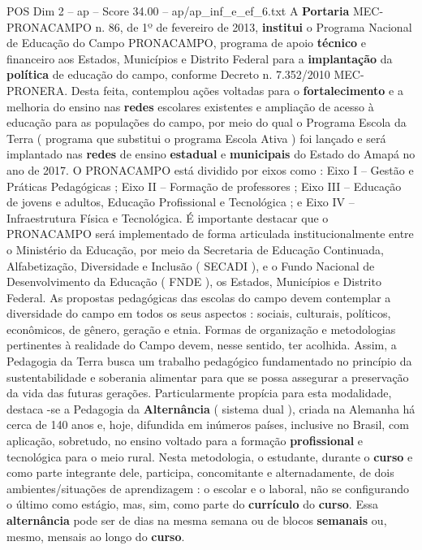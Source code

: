 \begin{textsample}{POS Dim 2 – ap – Score 34.00 – ap/ap\_inf\_e\_ef\_6.txt}
A \textbf{Portaria} MEC-PRONACAMPO n. 86, de 1º de fevereiro de 2013, \textbf{institui} o Programa Nacional de Educação do Campo PRONACAMPO, programa de apoio \textbf{técnico} e financeiro aos Estados, Municípios e Distrito Federal para a \textbf{implantação} da \textbf{política} de educação do campo, conforme Decreto n. 7.352/2010 MEC-PRONERA.
Desta feita, contemplou ações voltadas para o \textbf{fortalecimento} e a melhoria do ensino nas \textbf{redes} escolares existentes e ampliação de acesso à educação para as populações do campo, por meio do qual o Programa Escola da Terra ( programa que substitui o programa Escola Ativa ) foi lançado e será implantado nas \textbf{redes} de ensino \textbf{estadual} e \textbf{municipais} do Estado do Amapá no ano de 2017.
O PRONACAMPO está dividido por eixos como : Eixo I – Gestão e Práticas Pedagógicas ; Eixo II – Formação de professores ; Eixo III – Educação de jovens e adultos, Educação Profissional e Tecnológica ; e Eixo IV – Infraestrutura Física e Tecnológica.
É importante destacar que o PRONACAMPO será implementado de forma articulada institucionalmente entre o Ministério da Educação, por meio da Secretaria de Educação Continuada, Alfabetização, Diversidade e Inclusão ( SECADI ), e o Fundo Nacional de Desenvolvimento da Educação ( FNDE ), os Estados, Municípios e Distrito Federal.
As propostas pedagógicas das escolas do campo devem contemplar a diversidade do campo em todos os seus aspectos : sociais, culturais, políticos, econômicos, de gênero, geração e etnia.
Formas de organização e metodologias pertinentes à realidade do Campo devem, nesse sentido, ter acolhida.
Assim, a Pedagogia da Terra busca um trabalho pedagógico fundamentado no princípio da sustentabilidade e soberania alimentar para que se possa assegurar a preservação da vida das futuras gerações.
Particularmente propícia para esta modalidade, destaca -se a Pedagogia da \textbf{Alternância} ( sistema dual ), criada na Alemanha há cerca de 140 anos e, hoje, difundida em inúmeros países, inclusive no Brasil, com aplicação, sobretudo, no ensino voltado para a formação \textbf{profissional} e tecnológica para o meio rural.
Nesta metodologia, o estudante, durante o \textbf{curso} e como parte integrante dele, participa, concomitante e alternadamente, de dois ambientes/situações de aprendizagem : o escolar e o laboral, não se configurando o último como estágio, mas, sim, como parte do \textbf{currículo} do \textbf{curso}.
Essa \textbf{alternância} pode ser de dias na mesma semana ou de blocos \textbf{semanais} ou, mesmo, mensais ao longo do \textbf{curso}.

\end{textsample}
